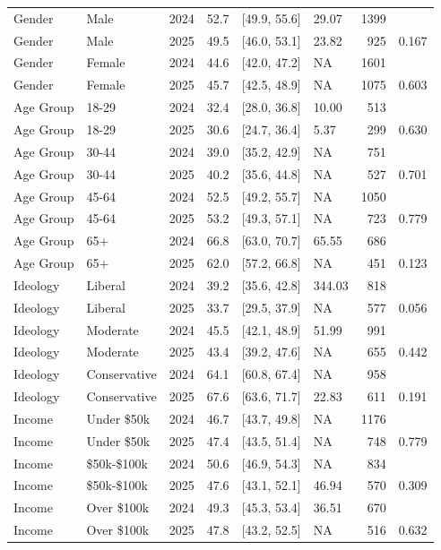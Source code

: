 \begin{table}[!h]
\begin{tabular}[t]{llllllrl}
Gender & Male & 2024 & 52.7 & {}[49.9, 55.6] & 29.07 & 1399 & \\
Gender & Male & 2025 & 49.5 & {}[46.0, 53.1] & 23.82 & 925 & 0.167\\
Gender & Female & 2024 & 44.6 & {}[42.0, 47.2] & NA & 1601 & \\
Gender & Female & 2025 & 45.7 & {}[42.5, 48.9] & NA & 1075 & 0.603\\
Age Group & 18-29 & 2024 & 32.4 & {}[28.0, 36.8] & 10.00 & 513 & \\
Age Group & 18-29 & 2025 & 30.6 & {}[24.7, 36.4] & 5.37 & 299 & 0.630\\
Age Group & 30-44 & 2024 & 39.0 & {}[35.2, 42.9] & NA & 751 & \\
Age Group & 30-44 & 2025 & 40.2 & {}[35.6, 44.8] & NA & 527 & 0.701\\
Age Group & 45-64 & 2024 & 52.5 & {}[49.2, 55.7] & NA & 1050 & \\
Age Group & 45-64 & 2025 & 53.2 & {}[49.3, 57.1] & NA & 723 & 0.779\\
Age Group & 65+ & 2024 & 66.8 & {}[63.0, 70.7] & 65.55 & 686 & \\
Age Group & 65+ & 2025 & 62.0 & {}[57.2, 66.8] & NA & 451 & 0.123\\
Ideology & Liberal & 2024 & 39.2 & {}[35.6, 42.8] & 344.03 & 818 & \\
Ideology & Liberal & 2025 & 33.7 & {}[29.5, 37.9] & NA & 577 & 0.056\\
Ideology & Moderate & 2024 & 45.5 & {}[42.1, 48.9] & 51.99 & 991 & \\
Ideology & Moderate & 2025 & 43.4 & {}[39.2, 47.6] & NA & 655 & 0.442\\
Ideology & Conservative & 2024 & 64.1 & {}[60.8, 67.4] & NA & 958 & \\
Ideology & Conservative & 2025 & 67.6 & {}[63.6, 71.7] & 22.83 & 611 & 0.191\\
Income & Under \$50k & 2024 & 46.7 & {}[43.7, 49.8] & NA & 1176 & \\
Income & Under \$50k & 2025 & 47.4 & {}[43.5, 51.4] & NA & 748 & 0.779\\
Income & \$50k-\$100k & 2024 & 50.6 & {}[46.9, 54.3] & NA & 834 & \\
Income & \$50k-\$100k & 2025 & 47.6 & {}[43.1, 52.1] & 46.94 & 570 & 0.309\\
Income & Over \$100k & 2024 & 49.3 & {}[45.3, 53.4] & 36.51 & 670 & \\
Income & Over \$100k & 2025 & 47.8 & {}[43.2, 52.5] & NA & 516 & 0.632\\
\bottomrule
\end{tabular}
\end{table}
